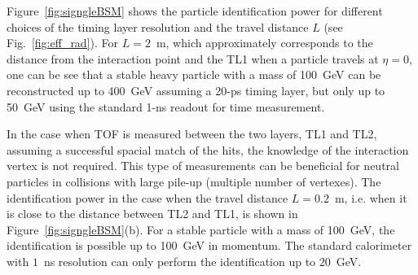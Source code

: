 Figure~\ref{fig:signgleBSM} shows the particle identification power for different choices of the timing layer resolution
and the travel distance $L$ (see Fig.~\ref{fig:eff_rad}).
For $L=2$~m, which approximately corresponds to the distance from the interaction point and 
the TL1 when a particle travels at $\eta=0$,  one can be see that a stable heavy particle with a mass of 100~GeV can be reconstructed up to 
400~GeV assuming a 20-ps timing layer,
but only up to 50~GeV using the standard 1-ns readout for time measurement.

In the case when  TOF is measured between the two layers, TL1 and TL2, assuming a successful spacial match of the hits,
the knowledge of the interaction vertex is not required.
This type of measurements can be beneficial
for neutral particles in collisions with large pile-up (multiple number of vertexes).
The identification power in the case when the travel distance $L=0.2$~m, i.e. when it  is close to the distance between TL2 and TL1, is shown in Figure~\ref{fig:signgleBSM}(b).
For a stable particle with a mass of 100~GeV, the identification is possible up to 100~GeV in momentum. The standard calorimeter with
$1$~ns resolution can only perform the identification up to $20$~GeV. 

